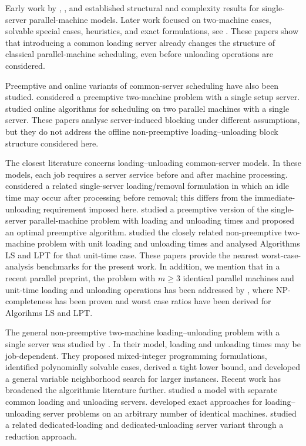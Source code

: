 \documentclass[11pt]{article}
\begin{document}
Early work by \cite{kravchenko1997}, 
\cite{hall2000}, and \cite{brucker2002} established structural and
complexity results for single-server parallel-machine models. Later work focused
on two-machine cases, solvable special cases, heuristics, and exact formulations, see 
\cite{abdekhodaee2002,abdekhodaee2004,abdekhodaee2006,gan2012,kim2012,hasani2014}.
These papers show that introducing a common loading server already changes the
structure of classical parallel-machine scheduling, even before unloading
operations are considered. 

Preemptive and online variants of common-server scheduling have also been studied.
\cite{jiang2013} considered a preemptive two-machine problem with a
single setup server. \cite{jiang2015_online} studied online
algorithms for scheduling on two parallel machines with a single server. These
papers analyse server-induced blocking under different assumptions, but they do
not address the offline non-preemptive loading--unloading block structure 
considered here.

The closest literature concerns loading--unloading common-server models. In these
models, each job requires a server service before and after machine processing.
\cite{xie2012} considered a related single-server loading/removal formulation in
which an  idle time may occur after processing before removal; this differs from the
immediate-unloading requirement imposed here. \cite{jiang2014_preemptive} studied
a preemptive version of the single-server parallel-machine problem with loading and
unloading times and proposed an optimal preemptive algorithm.
\cite{jiang2015_loading_unloading} studied the closely related non-preemptive
two-machine problem with unit loading and unloading times and analysed Algorithms  LS and LPT
for that unit-time case. These papers provide the nearest worst-case-analysis
benchmarks for the present work. In addition, we mention that in a recent parallel preprint, the problem
with $m \ge 3$ identical parallel machines and unit-time loading and unloading operations has been addressed by 
\cite{hasani2026}, where NP-completeness has been proven and worst case ratios have been derived for Algorihms LS and LPT.

The general non-preemptive two-machine loading--unloading problem with a single
server was studied by \cite{elidrissi2024}. In their model,
loading and unloading times may be job-dependent. They proposed mixed-integer
programming formulations, identified polynomially solvable cases, derived a tight
lower bound, and developed a general variable neighborhood search for larger
instances. Recent work has broadened the algorithmic literature further.
\cite{elidrissi2022_twoservers} studied a model with separate
common loading and unloading servers. \cite{druetto2025}
developed exact approaches for loading--unloading server problems on an arbitrary
number of identical machines. \cite{elidrissi2026_reduction}
studied a related dedicated-loading and dedicated-unloading server variant through
a reduction approach.
\end{document}
